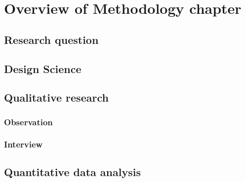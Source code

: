\documentclass[../Main/thesis.tex]{subfiles}
\begin{document}
\chapter*{Overview of Methodology chapter}

\section*{Research question}

\section*{Design Science}

\section*{Qualitative research}

\subsection*{Observation}

\subsection*{Interview}

\section*{Quantitative data analysis}
\end{document}
